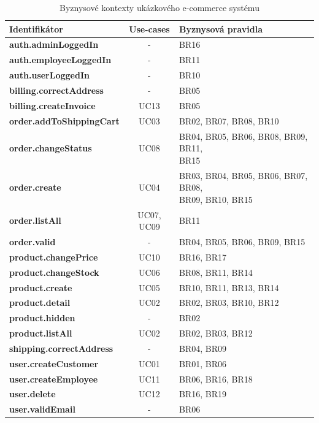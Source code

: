 \begin{table}
    \centering
    \begin{tabular*}{\textwidth}{ l c l }
        \hline
        \textbf{Identifikátor} & \textbf{Use-cases} & \textbf{Byznysová pravidla} \\ \hline \hline
        \textbf{auth.adminLoggedIn} & - & BR16 \\ \hline
        \textbf{auth.employeeLoggedIn} & - & BR11 \\ \hline
        \textbf{auth.userLoggedIn} & - & BR10 \\ \hline
        \textbf{billing.correctAddress} & - & BR05 \\ \hline
        \textbf{billing.createInvoice} & UC13 & BR05 \\ \hline
        \textbf{order.addToShippingCart} & UC03 & BR02, BR07, BR08, BR10 \\ \hline
        \textbf{order.changeStatus} & UC08 & \makecell[l]{BR04, BR05, BR06, BR08, BR09, BR11, \\ BR15} \\ \hline
        \textbf{order.create} & UC04 & \makecell[l]{BR03, BR04, BR05, BR06, BR07, BR08, \\ BR09, BR10, BR15} \\ \hline
        \textbf{order.listAll} & UC07, UC09 & BR11 \\ \hline
        \textbf{order.valid} & - & BR04, BR05, BR06, BR09, BR15 \\ \hline
        \textbf{product.changePrice} & UC10 & BR16, BR17 \\ \hline
        \textbf{product.changeStock} & UC06 & BR08, BR11, BR14 \\ \hline
        \textbf{product.create} & UC05 & BR10, BR11, BR13, BR14 \\ \hline
        \textbf{product.detail} & UC02 & BR02, BR03, BR10, BR12 \\ \hline
        \textbf{product.hidden} & - & BR02 \\ \hline
        \textbf{product.listAll} & UC02 & BR02, BR03, BR12 \\ \hline
        \textbf{shipping.correctAddress} & - & BR04, BR09 \\ \hline
        \textbf{user.createCustomer} & UC01 & BR01, BR06 \\ \hline
        \textbf{user.createEmployee} & UC11 & BR06, BR16, BR18 \\ \hline
        \textbf{user.delete} & UC12 & BR16, BR19 \\ \hline
        \textbf{user.validEmail} & - & BR06 \\ \hline
        \hline
    \end{tabular*}
    \caption{Byznysové kontexty ukázkového e-commerce systému}
    \label{tbl:business-contexts}
\end{table}

